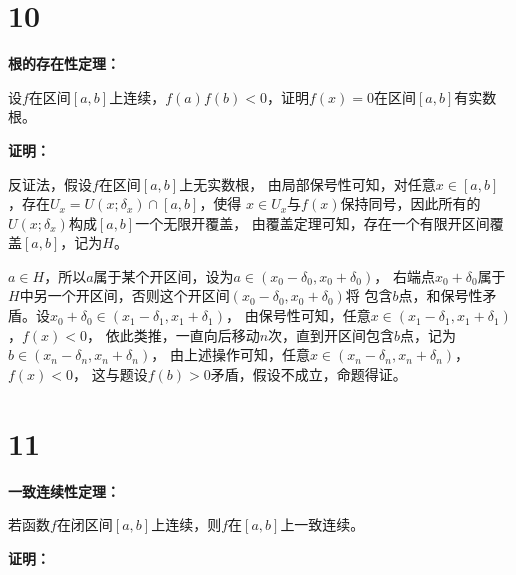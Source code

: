 \documentclass{article}
\begin{document}
\section*{10}

\textbf{根的存在性定理：}

设$f$在区间$[a, b]$上连续，$f(a)f(b) < 0$，证明$f(x) = 0$在区间$[a, b]$有实数根。

\textbf{证明：}

反证法，假设$f$在区间$[a, b]$上无实数根，
由局部保号性可知，对任意$x \in [a, b]$，存在$U_x = U(x; \delta_x) \cap [a, b]$，使得
$x \in U_x$与$f(x)$保持同号，因此所有的$U(x; \delta_x)$构成$[a,b]$一个无限开覆盖，
由覆盖定理可知，存在一个有限开区间覆盖$[a, b]$，记为$H$。

$a \in H$，所以$a$属于某个开区间，设为$a \in (x_0 - \delta_0, x_0 + \delta_0)$，
右端点$x_0 + \delta_0$属于$H$中另一个开区间，否则这个开区间$(x_0 - \delta_0, x_0 + \delta_0)$将
包含$b$点，和保号性矛盾。设$x_0 + \delta_0 \in (x_1 - \delta_1, x_1 + \delta_1)$，
由保号性可知，任意$x \in (x_1 - \delta_1, x_1 + \delta_1)$，$f(x) < 0$，
依此类推，一直向后移动$n$次，直到开区间包含$b$点，记为$b \in (x_n - \delta_n, x_n + \delta_n)$，
由上述操作可知，任意$x \in (x_n - \delta_n, x_n + \delta_n)$，$f(x) < 0$，
这与题设$f(b) > 0$矛盾，假设不成立，命题得证。

\section*{11}

\textbf{一致连续性定理：}

若函数$f$在闭区间$[a, b]$上连续，则$f$在$[a, b]$上一致连续。

\textbf{证明：}
\end{document}
